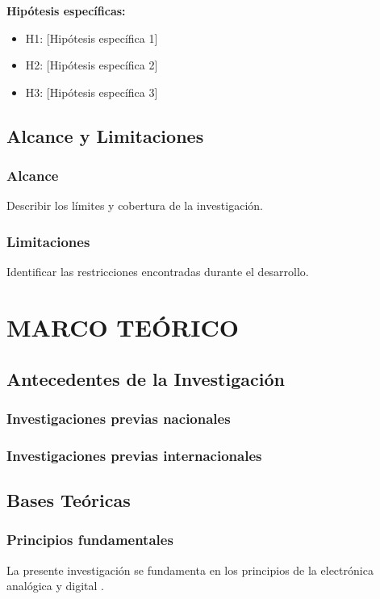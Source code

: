 \documentclass[12pt, letterpaper, oneside]{book}
\begin{document}
\textbf{Hipótesis específicas:}
\begin{itemize}
    \item H1: [Hipótesis específica 1]
    \item H2: [Hipótesis específica 2]
    \item H3: [Hipótesis específica 3]
\end{itemize}

\section{Alcance y Limitaciones}
\subsection{Alcance}
Describir los límites y cobertura de la investigación.

\subsection{Limitaciones}
Identificar las restricciones encontradas durante el desarrollo.

\chapter{MARCO TEÓRICO}

\section{Antecedentes de la Investigación}
\subsection{Investigaciones previas nacionales}
\subsection{Investigaciones previas internacionales}

\section{Bases Teóricas}
\subsection{Principios fundamentales}
La presente investigación se fundamenta en los principios de la electrónica analógica y digital \parencite{boylestad2022}.
\end{document}
